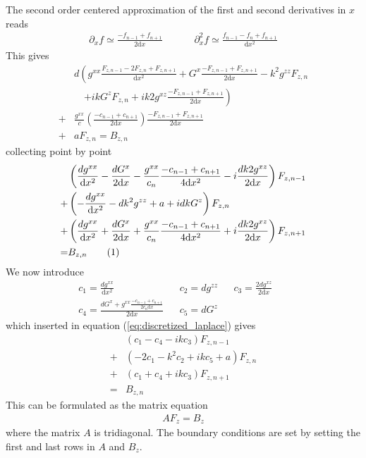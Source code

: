 \documentclass[12pt]{article}
\def\L{\left}
\def\R{\right}
\newcommand\numberthis{\addtocounter{equation}{1}\tag{\theequation}}
\begin{document}
The second order centered approximation of the first and second derivatives in
$x$ reads
%
\begin{align*}
    &&\partial_x f \simeq \frac{-f_{n-1} + f_{n+1}}{2\text{d}x}&&
    &&\partial_x^2 f \simeq \frac{f_{n-1} - f_{n} + f_{n+1}}{\text{d}x^2}&&
\end{align*}
%
This gives
%
\begin{align*}
    \, &d \L(    g^{xx} \frac{F_{z,n-1} - 2F_{z,n} + F_{z, n+1}}{\text{d}x^2} +
    G^x \frac{-F_{z,n-1} + F_{z,n+1}}{2\text{d}x} - k^2 g^{zz}F_{z,n} \R.\\
    &\quad\L.  + i kG^zF_{z,n} + i k2g^{xz} \frac{-F_{z,n-1} +
F_{z,n+1}}{2\text{d}x} \R) \\
%
    +& \frac{g^{xx}}{c} \L( \frac{-c_{n-1} + c_{n+1}}{2\text{d}x} \R)
\frac{-F_{z,n-1} + F_{z,n+1}}{2\text{d}x} \\
%
    +& aF_{z,n} = B_{z,n}
\end{align*}
%
collecting point by point
%
\begin{align*}
    &\L( \frac{dg^{xx}}{\text{d}x^2} - \frac{dG^x}{2\text{d}x} -
    \frac{g^{xx}}{c_{n}} \frac{-c_{n-1} + c_{n+1}}{4\text{d}x^2} - i\frac{d
    k2g^{xz}}{2\text{d}x} \R) F_{z,n-1} \\
    +&\L( - \frac{ dg^{xx} }{\text{d}x^2} - dk^2 g^{zz} + a + idkG^z \R)
    F_{z,n} \\
    +&\L( \frac{dg^{xx}}{\text{d}x^2} + \frac{dG^x}{2\text{d}x} +
    \frac{g^{xx}}{c_{n}} \frac{-c_{n-1} + c_{n+1}}{4\text{d}x^2} +
    i\frac{dk2g^{xz}}{2\text{d}x} \R) F_{z, n+1} \\
%
     =& B_{z,n} \numberthis
%
\label{eq:discretized_laplace}
%
\end{align*}
%
We now introduce
%
\begin{align*}
    &c_1 = \frac{dg^{xx}}{\text{d}x^2}& &c_2 = dg^{zz}& &c_3 =
    \frac{2dg^{xz}}{2\text{d}x}& && \\ &c_4 = \frac{dG^x + g^{xx}\frac{-c_{n-1}
    + c_{n+1}}{2c_n\text{d}x}}{2\text{d}x}& &c_5 = dG^z& &&
\end{align*}
%
which inserted in equation (\ref{eq:discretized_laplace}) gives
%
\begin{align*}
    &\L( c_1 - c_4 -ikc_3 \R) F_{z,n-1} \\
    +&\L( -2c_1 - k^2c_2 +ikc_5 + a \R) F_{z,n} \\
    +&\L( c_1 + c_4 + ikc_3 \R) F_{z, n+1} \\
%
     =& B_{z,n}
\end{align*}
%
This can be formulated as the matrix equation
%
\begin{align*}
    AF_z=B_z
\end{align*}
%
where the matrix $A$ is tridiagonal. The boundary conditions are set by setting
the first and last rows in $A$ and $B_z$.
%
\end{document}
